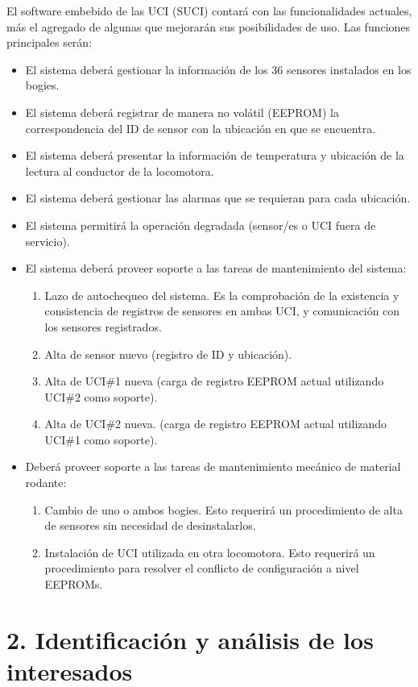 \documentclass[
11pt, %
codirector, %
]{charter}
\begin{document}
El software embebido de las UCI (SUCI) contará con las funcionalidades actuales, más el agregado de algunas que mejorarán sus posibilidades de uso. Las funciones principales serán:
\begin{itemize}
\item El sistema deberá gestionar la información de los 36 sensores instalados en los bogies.
	\item El sistema deberá registrar de manera no volátil (EEPROM) la correspondencia del ID de sensor con la ubicación en que se encuentra.
	\item El sistema deberá presentar la información de temperatura y ubicación de la lectura al conductor de la locomotora.
	\item El sistema deberá gestionar las alarmas que se requieran para cada ubicación.
	\item El sistema permitirá la operación degradada (sensor/es o UCI fuera de servicio).
	\item El sistema deberá proveer soporte a las tareas de mantenimiento del sistema:
	\begin{enumerate}
	\item Lazo de autochequeo del sistema. Es la comprobación de la existencia y consistencia de registros de sensores en ambas UCI, y comunicación con los sensores registrados.
	\item Alta de sensor nuevo (registro de ID y ubicación). 
	\item Alta de UCI\#1 nueva (carga de registro EEPROM actual utilizando UCI\#2 como soporte).
	\item Alta de UCI\#2 nueva. (carga de registro EEPROM actual utilizando UCI\#1 como soporte).
	\end{enumerate}
	\item Deberá proveer soporte a las tareas de mantenimiento mecánico de material rodante: 
	\begin{enumerate}
	\item Cambio de uno o ambos bogies. Esto requerirá un procedimiento de alta de sensores sin necesidad de desinstalarlos.
	\item Instalación de UCI utilizada en otra locomotora. Esto requerirá un procedimiento para resolver el conflicto de configuración a nivel EEPROMs.   
	\end{enumerate}
\end{itemize}
 
\section{2. Identificación y análisis de los interesados}
\label{sec:interesados}
\end{document}
